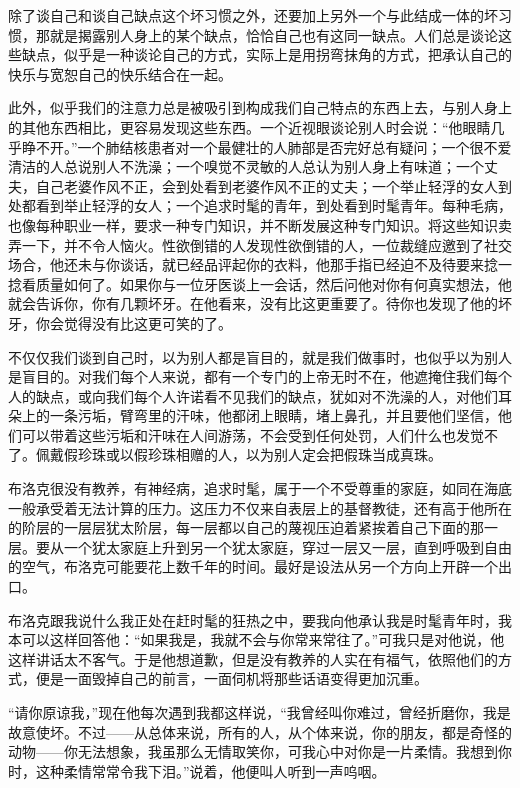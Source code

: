 \par 除了谈自己和谈自己缺点这个坏习惯之外，还要加上另外一个与此结成一体的坏习惯，那就是揭露别人身上的某个缺点，恰恰自己也有这同一缺点。人们总是谈论这些缺点，似乎是一种谈论自己的方式，实际上是用拐弯抹角的方式，把承认自己的快乐与宽恕自己的快乐结合在一起。
\par 此外，似乎我们的注意力总是被吸引到构成我们自己特点的东西上去，与别人身上的其他东西相比，更容易发现这些东西。一个近视眼谈论别人时会说：“他眼睛几乎睁不开。”一个肺结核患者对一个最健壮的人肺部是否完好总有疑问；一个很不爱清洁的人总说别人不洗澡；一个嗅觉不灵敏的人总认为别人身上有味道；一个丈夫，自己老婆作风不正，会到处看到老婆作风不正的丈夫；一个举止轻浮的女人到处都看到举止轻浮的女人；一个追求时髦的青年，到处看到时髦青年。每种毛病，也像每种职业一样，要求一种专门知识，并不断发展这种专门知识。将这些知识卖弄一下，并不令人恼火。性欲倒错的人发现性欲倒错的人，一位裁缝应邀到了社交场合，他还未与你谈话，就已经品评起你的衣料，他那手指已经迫不及待要来捻一捻看质量如何了。如果你与一位牙医谈上一会话，然后问他对你有何真实想法，他就会告诉你，你有几颗坏牙。在他看来，没有比这更重要了。待你也发现了他的坏牙，你会觉得没有比这更可笑的了。
\par 不仅仅我们谈到自己时，以为别人都是盲目的，就是我们做事时，也似乎以为别人是盲目的。对我们每个人来说，都有一个专门的上帝无时不在，他遮掩住我们每个人的缺点，或向我们每个人许诺看不见我们的缺点，犹如对不洗澡的人，对他们耳朵上的一条污垢，臂弯里的汗味，他都闭上眼睛，堵上鼻孔，并且要他们坚信，他们可以带着这些污垢和汗味在人间游荡，不会受到任何处罚，人们什么也发觉不了。佩戴假珍珠或以假珍珠相赠的人，以为别人定会把假珠当成真珠。
\par 布洛克很没有教养，有神经病，追求时髦，属于一个不受尊重的家庭，如同在海底一般承受着无法计算的压力。这压力不仅来自表层上的基督教徒，还有高于他所在的阶层的一层层犹太阶层，每一层都以自己的蔑视压迫着紧挨着自己下面的那一层。要从一个犹太家庭上升到另一个犹太家庭，穿过一层又一层，直到呼吸到自由的空气，布洛克可能要花上数千年的时间。最好是设法从另一个方向上开辟一个出口。
\par 布洛克跟我说什么我正处在赶时髦的狂热之中，要我向他承认我是时髦青年时，我本可以这样回答他：“如果我是，我就不会与你常来常往了。”可我只是对他说，他这样讲话太不客气。于是他想道歉，但是没有教养的人实在有福气，依照他们的方式，便是一面毁掉自己的前言，一面伺机将那些话语变得更加沉重。
\par “请你原谅我，”现在他每次遇到我都这样说，“我曾经叫你难过，曾经折磨你，我是故意使坏。不过——从总体来说，所有的人，从个体来说，你的朋友，都是奇怪的动物——你无法想象，我虽那么无情取笑你，可我心中对你是一片柔情。我想到你时，这种柔情常常令我下泪。”说着，他便叫人听到一声呜咽。
